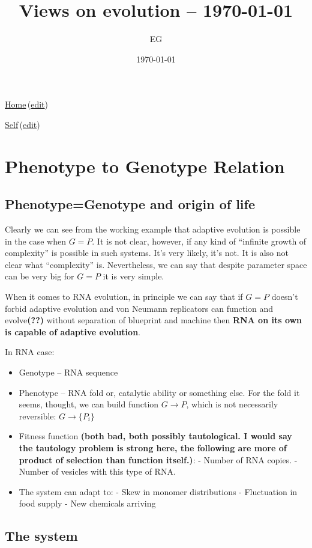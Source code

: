 \documentclass[12pt]{paper}
\title{Views on evolution -- \today}
\author{EG}
\date{\today}
\newcommand{\wikilink}[2] { \href{#1.pdf}{#2}\,(\href{#1.tex}{edit})}
\begin{document}
 \maketitle
 
 \wikilink{home}{Home}

\wikilink{viewsEvolution}{Self}
 
 \tableofcontents
 \section{Phenotype to Genotype Relation}
\subsection{Phenotype=Genotype and origin of life}

Clearly we can see from the working example\cite{Cliff1993} that adaptive evolution is possible in 
the case when $G=P$. It is not clear, however, if any kind of ``infinite growth of complexity'' is 
possible in such systems. It's very likely, it's not. It is also not clear what ``complexity'' is. 
Nevertheless, we can say that despite parameter space can be very big for $G=P$ it is very simple. 

When it comes to RNA evolution, in principle we can say that if $G=P$ doesn't forbid adaptive 
evolution and von Neumann replicators can function and evolve\cite{Freitas2004}\textbf{(??)} 
without separation of blueprint and machine then \textbf{RNA on its own is capable of adaptive 
evolution}.

In RNA case:
\begin{itemize}
 \item Genotype -- RNA sequence
 \item Phenotype -- RNA fold or, catalytic ability or something else. For the fold it seems, 
thought, we can build function $G\to P$, which is not necessarily reversible: $G\to\{P_i\}$ 
\item Fitness function \textbf{(both bad, both possibly tautological. I would say the tautology 
problem is strong here, the following are more of product of selection than function itself.)}:
  \subitem - Number of RNA copies.
  \subitem - Number of vesicles  with this type of RNA.
\item The system can adapt to:
  \subitem - Skew in monomer distributions
  \subitem - Fluctuation in food supply
  \subitem - New chemicals arriving
\end{itemize}


 \subsection{The system}
 
\end{document}
